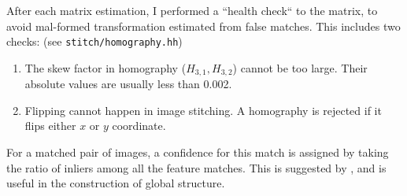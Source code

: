 After each matrix estimation, I performed
a ``health check`` to the matrix,
to avoid mal-formed transformation
estimated from false matches.
This includes two checks: (see \verb|stitch/homography.hh|)
\begin{enumerate}

  \item  The skew factor in homography
    ($ H_{3,1},H_{3,2}$) cannot be too large. Their
    absolute values are usually less than 0.002.

  \item Flipping cannot happen in image stitching.
    A homography is rejected if it flips either $x$
    or $y$ coordinate.
\end{enumerate}

For a matched pair of images,
a confidence for this match
is assigned by taking the ratio of inliers
among all the feature matches. This is
suggested by \cite{panoramic-sift}, and is useful
in the construction of global structure.
